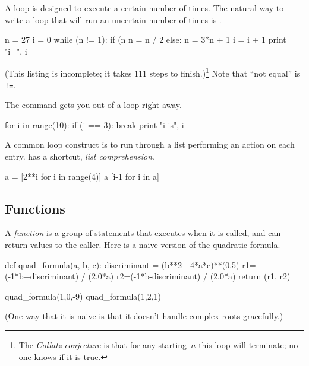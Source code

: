 A  loop is designed to execute a certain
number of times.
The natural way to write a loop that will run an uncertain number of times
is .
\begin{pythonoutput}[d,13,121]
n = 27
i = 0
while (n != 1):
    if (n%
        n = n / 2
    else:
        n = 3*n + 1
    i = i + 1
    print "i=", i
 
\end{pythonoutput}
\noindent
(This listing is incomplete; it takes $111$ steps to finish.)\footnote{The 
\protect\textit{Collatz conjecture} is 
that for any starting~$n$ this loop will 
terminate; no one knows if it is true.}
Note that ``not equal'' is \lstinline[style=inline]@!=@. 

The  command gets you out of a loop right away.
\begin{pythonoutput}
for i in range(10):
    if (i == 3):
        break
    print "i is", i

\end{pythonoutput}

A common loop construct is to run through a list
performing an action on each entry.
\python{} has a shortcut, \textit{list comprehension}.
\begin{pythonoutput}
a = [2**i for i in range(4)]
a
[i-1 for i in a]
\end{pythonoutput}



\subsection{Functions}
A \textit{function} is a group of statements that executes when it is called,
and can return values to the caller.
Here is a naive version of the quadratic formula.
\begin{pythonoutput}
def quad_formula(a, b, c):
    discriminant = (b**2 - 4*a*c)**(0.5)
    r1=(-1*b+discriminant) / (2.0*a)
    r2=(-1*b-discriminant) / (2.0*a)
    return (r1, r2)

quad_formula(1,0,-9)
quad_formula(1,2,1)
\end{pythonoutput}
\noindent
(One way that it is naive is that it doesn't handle complex roots gracefully.)
%

